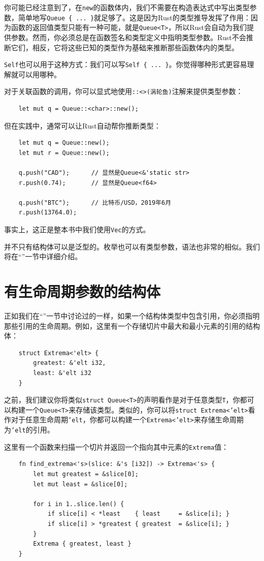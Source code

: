 你可能已经注意到了，在\texttt{new}的函数体内，我们不需要在构造表达式中写出类型参数，简单地写\texttt{Queue \{ ... \}}就足够了。这是因为Rust的类型推导发挥了作用：因为函数的返回值类型只能有一种可能，就是\texttt{Queue<T>}，所以Rust会自动为我们提供参数。然而，你必须总是在函数签名和类型定义中指明类型参数。Rust不会推断它们，相反，它将这些已知的类型作为基础来推断那些函数体内的类型。

\texttt{Self}也可以用于这种方式：我们可以写\texttt{Self \{ ... \}}。你觉得哪种形式更容易理解就可以用哪种。

对于关联函数的调用，你可以显式地使用\texttt{::<>(涡轮鱼)}注解来提供类型参数：
\begin{verbatim}
    let mut q = Queue::<char>::new();
\end{verbatim}

但在实践中，通常可以让Rust自动帮你推断类型：
\begin{verbatim}
    let mut q = Queue::new();
    let mut r = Queue::new();

    q.push("CAD");      // 显然是Queue<&'static str>
    r.push(0.74);       // 显然是Queue<f64>

    q.push("BTC");      // 比特币/USD，2019年6月 
    r.push(13764.0);    
\end{verbatim}

事实上，这正是整本书中我们使用\texttt{Vec}的方式。

并不只有结构体可以是泛型的。枚举也可以有类型参数，语法也非常的相似。我们将在“”一节中详细介绍。

\section{有生命周期参数的结构体}

正如我们在“”一节中讨论过的一样，如果一个结构体类型中包含引用，你必须指明那些引用的生命周期。例如，这里有一个存储切片中最大和最小元素的引用的结构体：
\begin{verbatim}
    struct Extrema<'elt> {
        greatest: &'elt i32,
        least: &'elt i32
    }
\end{verbatim}

之前，我们建议你将类似\texttt{struct Queue<T>}的声明看作是对于任意类型\texttt{T}，你都可以构建一个\texttt{Queue<T>}来存储该类型。类似的，你可以将\texttt{struct Extrema<'elt>}看作对于任意生命周期\texttt{'elt}，你都可以构建一个\texttt{Extrema<'elt>}来存储生命周期为\texttt{'elt}的引用。

这里有一个函数来扫描一个切片并返回一个指向其中元素的\texttt{Extrema}值：
\begin{verbatim}
    fn find_extrema<'s>(slice: &'s [i32]) -> Extrema<'s> {
        let mut greatest = &slice[0];
        let mut least = &slice[0];

        for i in 1..slice.len() {
            if slice[i] < *least    { least     = &slice[i]; }
            if slice[i] > *greatest { greatest  = &slice[i]; }
        }
        Extrema { greatest, least }
    }
\end{verbatim}

